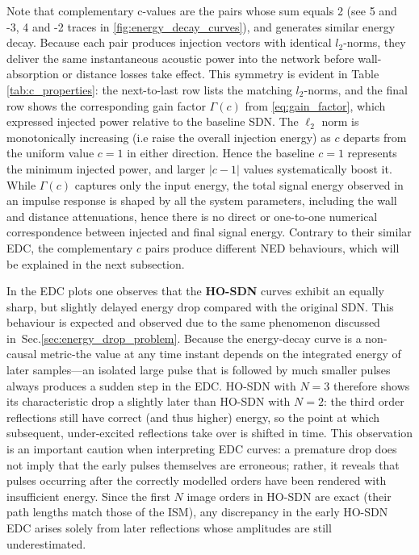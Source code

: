 \documentclass[journal]{IEEEtran}
\begin{document}
Note that complementary c-values are the pairs whose sum equals 2 (see 5 and -3, 4 and -2 traces in \ref{fig:energy_decay_curves}), and generates similar energy decay. Because each pair produces injection vectors with identical $l_2$-norms, they deliver the same instantaneous acoustic power into the network before wall-absorption or distance losses take effect. This symmetry is evident in Table \ref{tab:c_properties}: the next-to-last row lists the matching $l_2$-norms, and the final row shows the corresponding gain factor $\Gamma(c)$ from \eqref{eq:gain_factor}, which expressed injected power relative to the baseline SDN. The $\ell_2$ norm is monotonically increasing (i.e raise the overall injection energy) as $c$ departs from the uniform value $c=1$ in either direction. Hence the baseline $c=1$ represents the minimum injected power, and larger $|c-1|$  values systematically boost it. While $\Gamma(c)$ captures only the input energy, the total signal energy observed in an impulse response is shaped by all the system parameters, including the wall and distance attenuations, hence there is no direct or one-to-one numerical correspondence between injected and final signal energy. Contrary to their similar EDC, the complementary $c$ pairs produce different NED behaviours, which will be explained in the next subsection.

In the EDC plots one observes that the \textbf{HO-SDN} curves exhibit an equally sharp, but slightly delayed energy drop compared with the original SDN.
This behaviour is expected and observed due to the same phenomenon discussed in~Sec.\ref{sec:energy_drop_problem}. 
Because the energy-decay curve is a non-causal metric-the value
at any time instant depends on the integrated energy of later
samples—an isolated large pulse that is followed by much smaller pulses
always produces a sudden step in the EDC. HO-SDN with $N=3$ therefore shows its characteristic drop a slightly later than HO-SDN with $N=2$: 
the third order reflections still have correct (and thus higher) energy, so the point at which subsequent, under-excited reflections take over is shifted in time. This observation is an important caution when interpreting EDC curves:
a premature drop does not imply that the early pulses themselves
are erroneous; rather, it reveals that pulses occurring after
the correctly modelled orders have been rendered with insufficient
energy. Since the first $N$ image orders in HO-SDN are exact (their
path lengths match those of the ISM), any discrepancy in the early HO-SDN EDC arises
solely from later reflections whose amplitudes are still underestimated.
 
\end{document}
